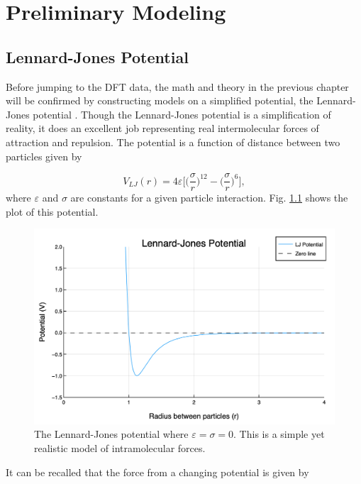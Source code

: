 \chapter{Preliminary Modeling}\label{Sect:modelPrep}

\section{Lennard-Jones Potential}\label{Sect:LJPotential}
Before jumping to the DFT data, the math and theory in the previous chapter will be confirmed by constructing models on a simplified potential, the Lennard-Jones potential \cite{LJ-potential}. Though the Lennard-Jones potential is a simplification of reality, it does an excellent job representing real intermolecular forces of attraction and repulsion. The potential is a function of distance between two particles given by

\begin{equation} \label{eq:LJ}
V_{LJ}(r) = 4\varepsilon \bigg[\Big(\frac{\sigma}{r}\Big)^{12} - \Big(\frac{\sigma}{r}\Big)^6\bigg],
\end{equation}
where $\varepsilon$ and $\sigma$ are constants for a given particle interaction. Fig. \ref{fig:LJ} shows the plot of this potential.

\begin{figure}%
\centering
\includegraphics[scale = 0.6]{Figures/LJPotential}
\caption{The Lennard-Jones potential where $\varepsilon=\sigma=0$. This is a simple yet realistic model of intramolecular forces.
\label{fig:LJ}} 
\end{figure}

\par It can be recalled that the force from a changing potential is given by

